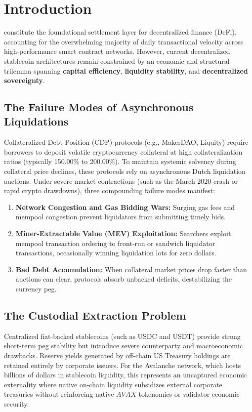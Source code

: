 \documentclass[10pt,journal,compsoc]{IEEEtran}
\begin{document}
\maketitle
\IEEEdisplaynontitleabstractindextext
\IEEEpeerreviewmaketitle

\section{Introduction}
 constitute the foundational settlement layer for decentralized finance (DeFi), accounting for the overwhelming majority of daily transactional velocity across high-performance smart contract networks. However, current decentralized stablecoin architectures remain constrained by an economic and structural trilemma spanning \textbf{capital efficiency}, \textbf{liquidity stability}, and \textbf{decentralized sovereignty}.

\subsection{The Failure Modes of Asynchronous Liquidations}
Collateralized Debt Position (CDP) protocols (e.g., MakerDAO, Liquity) require borrowers to deposit volatile cryptocurrency collateral at high collateralization ratios (typically 150.00\% to 200.00\%). To maintain systemic solvency during collateral price declines, these protocols rely on asynchronous Dutch liquidation auctions. Under severe market contractions (such as the March 2020 crash or rapid crypto drawdowns), three compounding failure modes manifest:
\begin{enumerate}
    \item \textbf{Network Congestion and Gas Bidding Wars:} Surging gas fees and mempool congestion prevent liquidators from submitting timely bids.
    \item \textbf{Miner-Extractable Value (MEV) Exploitation:} Searchers exploit mempool transaction ordering to front-run or sandwich liquidator transactions, occasionally winning liquidation lots for zero dollars.
    \item \textbf{Bad Debt Accumulation:} When collateral market prices drop faster than auctions can clear, protocols absorb unbacked deficits, destabilizing the currency peg.
\end{enumerate}

\subsection{The Custodial Extraction Problem}
Centralized fiat-backed stablecoins (such as USDC and USDT) provide strong short-term peg stability but introduce severe counterparty and macroeconomic drawbacks. Reserve yields generated by off-chain US Treasury holdings are retained entirely by corporate issuers. For the Avalanche network, which hosts billions of dollars in stablecoin liquidity, this represents an uncaptured economic externality where native on-chain liquidity subsidizes external corporate treasuries without reinforcing native $AVAX$ tokenomics or validator economic security.
\end{document}
